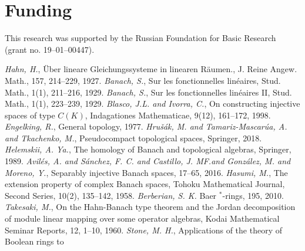 \documentclass[12pt]{article}
\begin{document}
\section{Funding}\label{SectionFunding} This research was supported by the
Russian Foundation for Basic Research (grant no. 19--01--00447).


\begin{thebibliography}{999}
    \textit{Hahn, H.}, {\"U}ber lineare Gleichungssysteme in linearen
    R{\"a}umen., J. Reine Angew. Math., 157, 214--229, 1927.
    \textit{Banach, S.}, Sur les fonctionnelles lin{\'e}aires, Stud. Math.,
    1(1), 211--216, 1929.
    \textit{Banach, S.}, Sur les fonctionnelles lin{\'e}aires II, Stud. Math.,
    1(1), 223--239, 1929.
    \textit{Blasco, J.L. and Ivorra, C.}, On constructing injective spaces of
    type $C(K)$, Indagationes Mathematicae, 9(12), 161--172, 1998.
    \textit{Engelking, R.}, General topology, 1977.
    \textit{Hru{\v{s}}{\'a}k, M. and Tamariz-Mascar{\'u}a, A. and Tkachenko,
    M.}, Pseudocompact topological spaces, Springer, 2018.
    \textit{Helemskii, A. Ya.}, The homology of Banach and topological algebras,
    Springer, 1989.
    \textit{Avil{\'e}s, A. and S{\'a}nchez, F. C. and Castillo, J. MF.\@ and
        Gonz{\'a}lez, M. and Moreno, Y.}, 
    Separably injective Banach spaces, 17--65, 2016.
    \textit{Hasumi, M.}, The extension property of complex Banach spaces, Tohoku
    Mathematical Journal, Second Series, 10(2), 135--142, 1958.
    \textit{Berberian, S. K.}
    Baer $^*$-rings, 195, 2010.
    \textit{Takesaki, M.}, On the Hahn-Banach type theorem and the Jordan
    decomposition of module linear mapping over some operator algebras, Kodai
    Mathematical Seminar Reports, 12, 1--10, 1960.
    \textit{Stone, M. H.}, Applications of the theory of Boolean rings to

\end{thebibliography}
\end{document}
